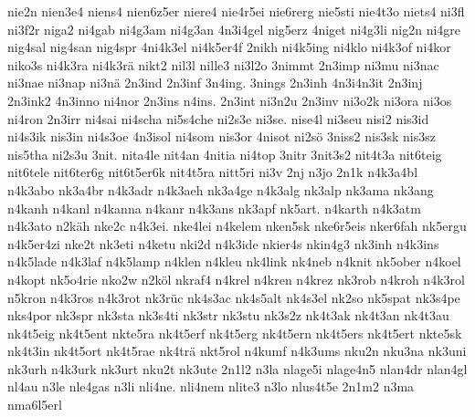 {    nie2n
    nien3e4
    niens4
    nien6z5er
    niere4
    nie4r5ei
    nie6rerg
    nie5sti
    nie4t3o
    niets4
    ni3fl
    ni3f2r
    niga2
    ni4gab
    ni4g3am
    ni4g3an
    4n3i4gel
    nig5erz
    4niget
    ni4g3li
    nig2n
    ni4gre
    nig4sal
    nig4san
    nig4spr
    4ni4k3el
    ni4k5er4f
    2nikh
    ni4k5ing
    ni4klo
    ni4k3of
    ni4kor
    niko3s
    ni4k3ra
    ni4k3rä
    nikt2
    nil3l
    nille3
    ni3l2o
    3nimmt
    2n3imp
    ni3mu
    ni3nac
    ni3nae
    ni3nap
    ni3nä
    2n3ind
    2n3inf
    3n4ing.
    3nings
    2n3inh
    4n3i4n3it
    2n3inj
    2n3ink2
    4n3inno
    ni4nor
    2n3ins
    n4ins.
    2n3int
    ni3n2u
    2n3inv
    ni3o2k
    ni3ora
    ni3os
    ni4ron
    2n3irr
    ni4sai
    ni4scha
    ni5s4che
    ni2s3e
    ni3se.
    nise4l
    ni3seu
    nisi2
    nis3id
    ni4s3ik
    nis3in
    ni4s3oe
    4n3isol
    ni4som
    nis3or
    4nisot
    ni2sö
    3niss2
    nis3sk
    nis3sz
    nis5tha
    ni2s3u
    3nit.
    nita4le
    nit4an
    4nitia
    ni4top
    3nitr
    3nit3s2
    nit4t3a
    nit6teig
    nit6tele
    nit6ter6g
    nit6t5er6k
    nit4t5ra
    nitt5ri
    ni3v
    2nj
    n3jo
    2n1k
    n4k3a4bl
    n4k3abo
    nk3a4br
    n4k3adr
    n4k3aeh
    nk3a4ge
    n4k3alg
    nk3alp
    nk3ama
    nk3ang
    n4kanh
    n4kanl
    n4kanna
    n4kanr
    n4k3ans
    nk3apf
    nk5art.
    n4karth
    n4k3atm
    n4k3ato
    n2käh
    nke2c
    n4k3ei.
    nke4lei
    n4kelem
    nken5sk
    nke6r5eis
    nker6fah
    nk5ergu
    n4k5er4zi
    nke2t
    nk3eti
    n4ketu
    nki2d
    n4k3ide
    nkier4s
    nkin4g3
    nk3inh
    n4k3ins
    n4k5lade
    n4k3laf
    n4k5lamp
    n4klen
    n4kleu
    nk4link
    nk4neb
    n4knit
    nk5ober
    n4koel
    n4kopt
    nk5o4rie
    nko2w
    n2köl
    nkraf4
    n4krel
    n4kren
    n4krez
    nk3rob
    n4kroh
    n4k3rol
    n5kron
    n4k3ros
    n4k3rot
    nk3rüc
    nk4s3ac
    nk4s5alt
    nk4s3el
    nk2so
    nk5spat
    nk3s4pe
    nks4por
    nk3spr
    nk3sta
    nk3s4ti
    nk3str
    nk3stu
    nk3s2z
    nk4t3ak
    nk4t3an
    nk4t3au
    nk4t5eig
    nk4t5ent
    nkte5ra
    nk4t5erf
    nk4t5erg
    nk4t5ern
    nk4t5ers
    nk4t5ert
    nkte5sk
    nk4t3in
    nk4t5ort
    nk4t5rae
    nk4trä
    nkt5rol
    n4kumf
    n4k3ums
    nku2n
    nku3na
    nk3uni
    nk3urh
    n4k3urk
    nk3urt
    nku2t
    nk3ute
    2n1l2
    n3la
    nlage5i
    nlage4n5
    nlan4dr
    nlan4gl
    nl4au
    n3le
    nle4gas
    n3li
    nli4ne.
    nli4nem
    nlite3
    n3lo
    nlus4t5e
    2n1m2
    n3ma
    nma6l5erl
}
